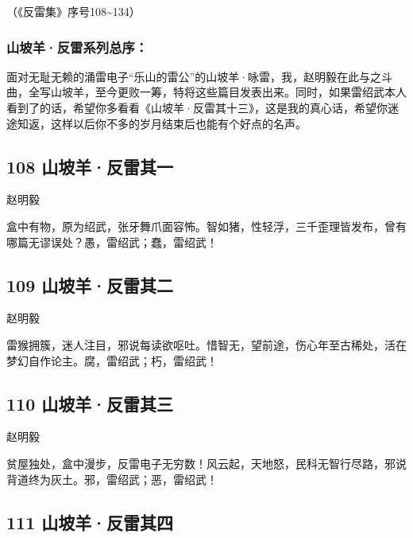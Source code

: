 （《反雷集》序号108\textasciitilde134）

\hypertarget{ux5c71ux5761ux7f8aux53cdux96f7ux7cfbux5217ux603bux5e8f}{%
\subsubsection{山坡羊·反雷系列总序：}\label{ux5c71ux5761ux7f8aux53cdux96f7ux7cfbux5217ux603bux5e8f}}

面对无耻无赖的涌雷电子``乐山的雷公''的山坡羊·咏雷，我，赵明毅在此与之斗曲，全写山坡羊，至今更败一筹，特将这些篇目发表出来。同时，如果雷绍武本人看到了的话，希望你多看看《山坡羊·反雷其十三》，这是我的真心话，希望你迷途知返，这样以后你不多的岁月结束后也能有个好点的名声。
~\\

\hypertarget{ux5c71ux5761ux7f8aux53cdux96f7ux5176ux4e00}{%
\subsection{108
山坡羊·反雷其一}\label{ux5c71ux5761ux7f8aux53cdux96f7ux5176ux4e00}}

{赵明毅}

盒中有物，原为绍武，张牙舞爪面容怖。智如猪，性轻浮，三千歪理皆发布，曾有哪篇无谬误处？愚，雷绍武；蠢，雷绍武！

\hypertarget{ux5c71ux5761ux7f8aux53cdux96f7ux5176ux4e8c}{%
\subsection{109
山坡羊·反雷其二}\label{ux5c71ux5761ux7f8aux53cdux96f7ux5176ux4e8c}}

{赵明毅}

雷猴拥簇，迷人注目，邪说每读欲呕吐。惜智无，望前途，伤心年至古稀处，活在梦幻自作论主。腐，雷绍武；朽，雷绍武！
~\\

\hypertarget{ux5c71ux5761ux7f8aux53cdux96f7ux5176ux4e09}{%
\subsection{110
山坡羊·反雷其三}\label{ux5c71ux5761ux7f8aux53cdux96f7ux5176ux4e09}}

{赵明毅}

贫屋独处，盒中漫步，反雷电子无穷数！风云起，天地怒，民科无智行尽路，邪说背道终为灰土。邪，雷绍武；恶，雷绍武！
~\\

\hypertarget{ux5c71ux5761ux7f8aux53cdux96f7ux5176ux56db}{%
\subsection{111
山坡羊·反雷其四}\label{ux5c71ux5761ux7f8aux53cdux96f7ux5176ux56db}}

